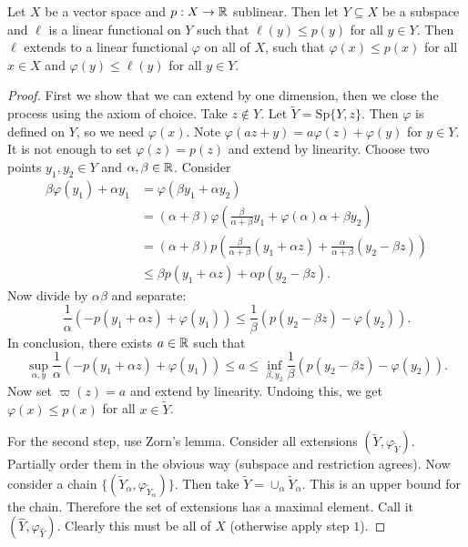 \documentclass[10pt, twoside]{article}
\begin{document}
    \begin{thm} Let $X$ be a vector space and $p: X \to \mathbb{R}$
        sublinear. Then let $Y \subseteq X$ be a subspace and $\ell$ is a
        linear functional on $Y$ such that $\ell(y) \leq p(y)$ for all $y \in
        Y$. Then $\ell$ extends to a linear functional $\varphi$ on all of $X$,
        such that $\varphi(x) \leq p(x)$ for all $x \in X$ and $\varphi(y) \leq
        \ell(y)$ for all $y \in Y$.  \begin{proof} First we show that we can
            extend by one dimension, then we close the process using the axiom
            of choice. Take $z \notin Y$. Let $\widetilde{Y} =
            \mathrm{Sp}\{Y,z\}$. Then $\varphi$ is defined on $Y$, so we need
            $\varphi(x)$. Note $\varphi(az + y) = a \varphi(z) + \varphi(y)$
            for $y \in Y$. It is not enough to set $\varphi(z) = p(z)$ and
            extend by linearity. Choose two points $y_1, y_2 \in Y$ and
            $\alpha,\beta \in \mathbb{R}$. Consider \begin{align*} \beta \varphi(y_1) +
                \alpha y_1 &= \varphi(\beta y_1 + \alpha y_2) \\ &= (\alpha +
                \beta)\varphi \left( \frac{\beta}{\alpha + \beta} y_1 +
                \varphi(\alpha){\alpha + \beta} y_2 \right) \\ &= (\alpha +
                \beta) p \left( \frac{\beta}{\alpha + \beta} (y_1 + \alpha z) +
            \frac{\alpha}{\alpha + \beta} (y_2 - \beta z) \right) \\ &\leq
            \beta p(y_1 + \alpha z) + \alpha p(y_2 - \beta z).  \end{align*}
            Now divide by $\alpha \beta$ and separate: \[ \frac{1}{\alpha}
                (-p(y_1 + \alpha z) + \varphi(y_1)) \leq \frac{1}{\beta} (p(y_2
                - \beta z) - \varphi(y_2)). \] In conclusion, there exists $a
                \in \mathbb{R}$ such that \[ \sup_{\alpha,y} \frac{1}{\alpha} (-p(y_1 +
                \alpha z) + \varphi(y_1)) \leq a \leq \inf_{\beta, y_2}
            \frac{1}{\beta} (p(y_2 - \beta z) - \varphi(y_2)). \] Now set
            $\varpi(z) = a$ and extend by linearity. Undoing this, we get
            $\varphi(x) \leq p(x)$ for all $x \in \widetilde{Y}$.

        For the second step, use Zorn's lemma. Consider all extensions $(
    \widetilde{Y}, \varphi_{\widetilde{Y}} )$. Partially order them in the
obvious way (subspace and restriction agrees). Now consider a chain
$\{(\widetilde{Y}_{\alpha}, \varphi_{\widetilde{Y}_\alpha})\}$. Then take
$\widetilde{Y} = \cup_{\alpha} \tilde{Y}_{\alpha}$. This is an upper bound for
the chain. Therefore the set of extensions has a maximal element. Call it $(
\hat{Y}, \varphi_{\hat{Y}} )$. Clearly this must be all of $X$ (otherwise apply
step $1$).  \end{proof} \end{thm}
\end{document}
